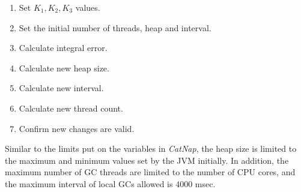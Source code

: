 \begin{enumerate}
\def\labelenumi{\arabic{enumi}.}
\item
 
  Set  \begin{math}  K_{1}, K_{2}, K_{3} \end{math}  values.
\item

  Set the initial number of threads, heap and interval.

\item
 
  Calculate integral error.
 
\item

  Calculate new heap size.
 
\item
  
  Calculate new interval.
  
\item
 
  Calculate new thread count.
 
\item

  Confirm new changes are valid.

\end{enumerate}
Similar to the limits put on the variables in \emph{CatNap}, the heap size is
limited to the maximum and minimum values set by the JVM initially. In addition,
the maximum number of GC threads are limited to the number of CPU cores,
and the maximum interval of local GCs allowed is 4000 msec.

